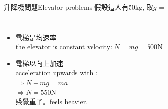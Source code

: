 \documentclass[beamer=true]{standalone}
\begin{document}
\begin{frame}{升降機問題Elevator problems}
    假設這人有50kg, 取$g$ = 

    \begin{columns}
        \begin{itemize}
            \setlength{\itemsep}{10pt}
            \item 電梯是均速率\\the elevator is constant velocity: $N=mg=500$N
            \item 電梯以向上加速\\acceleration upwards with : \\$\Rightarrow N-mg=ma$\\$\Rightarrow N=550$N\\感覺重了。feels heavier.


\end{itemize}
\end{columns}
\end{frame}
\end{document}
